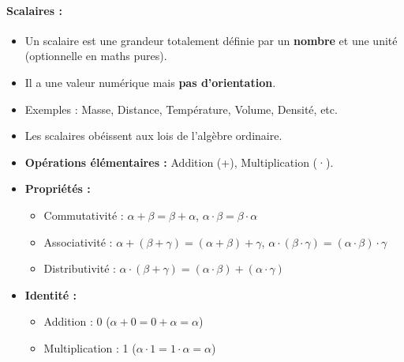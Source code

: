 \documentclass{article}
\begin{document}
\paragraph{Scalaires :}
\begin{itemize}
    \item Un scalaire est une grandeur totalement définie par un \textbf{nombre} et une unité (optionnelle en maths pures).
    \item Il a une valeur numérique mais \textbf{pas d'orientation}.
    \item Exemples : Masse, Distance, Température, Volume, Densité, etc.
    \item Les scalaires obéissent aux lois de l'algèbre ordinaire.
    \item \textbf{Opérations élémentaires :} Addition (+), Multiplication (·).
    \item \textbf{Propriétés :}
    \begin{itemize}
        \item Commutativité : $\alpha + \beta = \beta + \alpha$, $\alpha \cdot \beta = \beta \cdot \alpha$
        \item Associativité : $\alpha + (\beta + \gamma) = (\alpha + \beta) + \gamma$, $\alpha \cdot (\beta \cdot \gamma) = (\alpha \cdot \beta) \cdot \gamma$
        \item Distributivité : $\alpha \cdot (\beta + \gamma) = (\alpha \cdot \beta) + (\alpha \cdot \gamma)$
    \end{itemize}
    \item \textbf{Identité :}
    \begin{itemize}
        \item Addition : 0 ($\alpha + 0 = 0 + \alpha = \alpha$)
        \item Multiplication : 1 ($\alpha \cdot 1 = 1 \cdot \alpha = \alpha$)
    \end{itemize}
\end{itemize}
\end{document}
